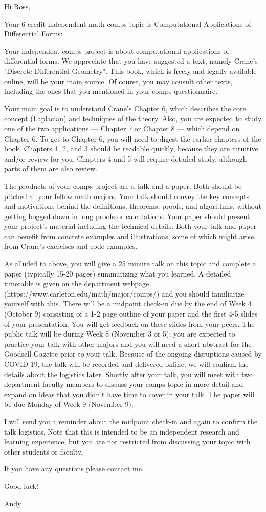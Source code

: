 Hi Ross,

Your 6 credit independent math comps topic is Computational Applications of Differential Forms:

Your independent comps project is about computational applications of differential forms. We appreciate that you have suggested a text, namely Crane's "Discrete Differential Geometry". This book, which is freely and legally available online, will be your main source. Of course, you may consult other texts, including the ones that you mentioned in your comps questionnaire.

Your main goal is to understand Crane's Chapter 6, which describes the core concept (Laplacian) and techniques of the theory. Also, you are expected to study one of the two applications --- Chapter 7 or Chapter 8 --- which depend on Chapter 6. To get to Chapter 6, you will need to digest the earlier chapters of the book. Chapters 1, 2, and 3 should be readable quickly, because they are intuitive and/or review for you. Chapters 4 and 5 will require detailed study, although parts of them are also review.

The products of your comps project are a talk and a paper. Both should be pitched at your fellow math majors. Your talk should convey the key concepts and motivations behind the definitions, theorems, proofs, and algorithms, without getting bogged down in long proofs or calculations. Your paper should present your project's material including the technical details. Both your talk and paper can benefit from concrete examples and illustrations, some of which might arise from Crane's exercises and code examples.

As alluded to above, you will give a 25 minute talk on this topic and complete a paper (typically 15-20 pages) summarizing what you learned. A detailed timetable is given on the department webpage (https://www.carleton.edu/math/major/comps/) and you should familiarize yourself with this. There will be a midpoint check-in due by the end of Week 4 (October 9) consisting of a 1-2 page outline of your paper and the first 4-5 slides of your presentation. You will get feedback on these slides from your peers. The public talk will be during Week 8 (November 3 or 5); you are expected to practice your talk with other majors and you will need a short abstract for the Goodsell Gazette prior to your talk. Because of the ongoing disruptions caused by COVID-19, the talk will be recorded and delivered online; we will confirm the details about the logistics later. Shortly after your talk, you will meet with two department faculty members to discuss your comps topic in more detail and expand on ideas that you didn’t have time to cover in your talk. The paper will be due Monday of Week 9 (November 9).

I will send you a reminder about the midpoint check-in and again to confirm the talk logistics. Note that this is intended to be an independent research and learning experience, but you are not restricted from discussing your topic with other students or faculty.

If you have any questions please contact me.

Good luck!

Andy